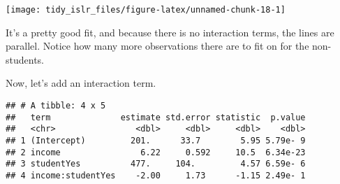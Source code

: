 \documentclass[]{book}
\newenvironment{Shaded}{\begin{snugshade}}{\end{snugshade}}
\newcommand{\DataTypeTok}[1]{\textcolor[rgb]{0.13,0.29,0.53}{#1}}
\newcommand{\DecValTok}[1]{\textcolor[rgb]{0.00,0.00,0.81}{#1}}
\newcommand{\FloatTok}[1]{\textcolor[rgb]{0.00,0.00,0.81}{#1}}
\newcommand{\KeywordTok}[1]{\textcolor[rgb]{0.13,0.29,0.53}{\textbf{#1}}}
\newcommand{\NormalTok}[1]{#1}
\newcommand{\OperatorTok}[1]{\textcolor[rgb]{0.81,0.36,0.00}{\textbf{#1}}}
\newcommand{\StringTok}[1]{\textcolor[rgb]{0.31,0.60,0.02}{#1}}
\begin{document}
\begin{center}\texttt{[image: tidy\_islr\_files/figure-latex/unnamed-chunk-18-1]} \end{center}

It's a pretty good fit, and because there is no interaction terms, the lines are parallel. Notice how many more observations there are to fit on for the non-students.

Now, let's add an interaction term.

\begin{Shaded}
\end{Shaded}

\begin{verbatim}
## # A tibble: 4 x 5
##   term              estimate std.error statistic  p.value
##   <chr>                <dbl>     <dbl>     <dbl>    <dbl>
## 1 (Intercept)         201.      33.7        5.95 5.79e- 9
## 2 income                6.22     0.592     10.5  6.34e-23
## 3 studentYes          477.     104.         4.57 6.59e- 6
## 4 income:studentYes    -2.00     1.73      -1.15 2.49e- 1
\end{verbatim}

\begin{Shaded}
\end{Shaded}
\end{document}

